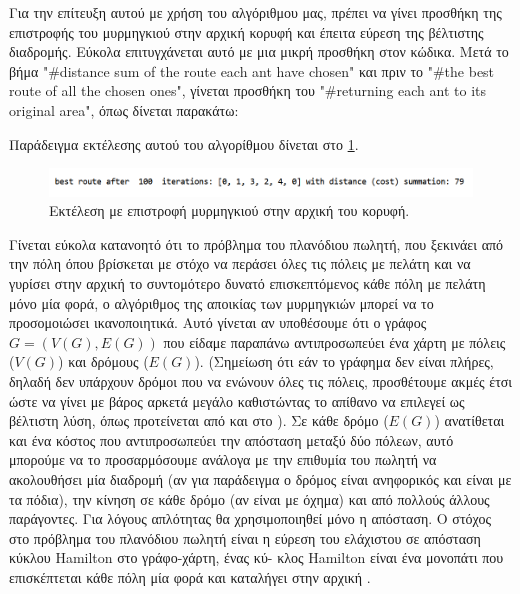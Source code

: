 Για την επίτευξη αυτού με χρήση του αλγόριθμου μας, πρέπει να γίνει προσθήκη της επιστροφής του μυρμηγκιού στην αρχική κορυφή και έπειτα εύρεση της βέλτιστης διαδρομής. Εύκολα επιτυγχάνεται αυτό με μια μικρή προσθήκη στον κώδικα. Μετά το βήμα "\#distance sum of the route each ant have chosen" και πριν το "\#the best route of all the chosen ones", γίνεται προσθήκη του "\#returning each ant to its original area", όπως δίνεται παρακάτω:

Παράδειγμα εκτέλεσης αυτού του αλγορίθμου δίνεται στο \ref{exret}.
\begin{figure}
    \centering
    \includegraphics[scale=0.55]{2947_thesis/pictures/ex7.png} 
    \caption{Εκτέλεση με επιστροφή μυρμηγκιού στην αρχική του κορυφή.}
    \label{exret}
\end{figure}

Γίνεται εύκολα κατανοητό ότι το πρόβλημα του πλανόδιου πωλητή, που ξεκινάει από την πόλη όπου βρίσκεται με στόχο να περάσει όλες τις πόλεις με πελάτη και να γυρίσει στην αρχική το συντομότερο δυνατό επισκεπτόμενος κάθε πόλη με πελάτη μόνο μία φορά, ο αλγόριθμος της αποικίας των μυρμηγκιών μπορεί να το προσομοιώσει ικανοποιητικά. 
Αυτό γίνεται αν υποθέσουμε ότι ο γράφος $G=(V(G), E(G))$  που είδαμε παραπάνω αντιπροσωπεύει ένα χάρτη με πόλεις ($V(G)$) και δρόμους ($E(G)$). (Σημείωση ότι εάν το γράφημα δεν είναι πλήρες, δηλαδή δεν υπάρχουν δρόμοι που να ενώνουν όλες τις πόλεις, προσθέτουμε ακμές έτσι ώστε να γίνει με βάρος αρκετά μεγάλο καθιστώντας το απίθανο να επιλεγεί ως βέλτιστη λύση, όπως προτείνεται από  και  στο \cite{dorigo2004ant}). Σε κάθε δρόμο ($E(G)$) ανατίθεται και ένα κόστος που αντιπροσωπεύει την απόσταση μεταξύ δύο πόλεων, αυτό μπορούμε να το προσαρμόσουμε ανάλογα με την επιθυμία του πωλητή να ακολουθήσει μία διαδρομή (αν για παράδειγμα ο δρόμος είναι ανηφορικός και είναι με τα πόδια), την κίνηση σε κάθε δρόμο (αν είναι με όχημα) και από πολλούς άλλους παράγοντες. Για λόγους απλότητας θα χρησιμοποιηθεί μόνο η απόσταση. Ο στόχος στο πρόβλημα του πλανόδιου πωλητή είναι η εύρεση του ελάχιστου σε απόσταση κύκλου Hamilton στο γράφο-χάρτη, ένας κύ- κλος Hamilton είναι ένα μονοπάτι που επισκέπτεται κάθε πόλη μία φορά και καταλήγει στην αρχική \cite{dorigo2004ant}.

